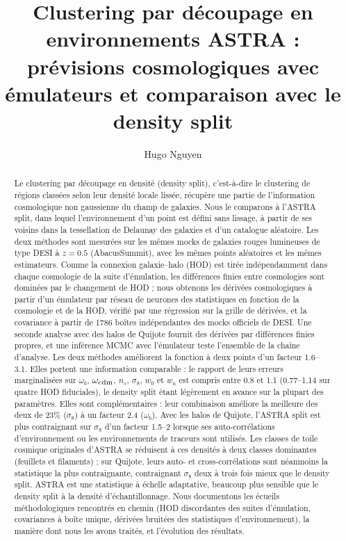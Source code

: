 \documentclass[11pt,twocolumn]{article}
\title{Clustering par découpage en environnements ASTRA : prévisions cosmologiques avec émulateurs et comparaison avec le density split}
\author{Hugo Nguyen}
\date{}
\begin{document}
\maketitle

\begin{abstract}
Le clustering par découpage en densité (density split), c'est-à-dire le clustering de régions classées selon leur densité locale lissée, récupère une partie de l'information cosmologique non gaussienne du champ de galaxies. Nous le comparons à l'ASTRA split, dans lequel l'environnement d'un point est défini sans lissage, à partir de ses voisins dans la tessellation de Delaunay des galaxies et d'un catalogue aléatoire. Les deux méthodes sont mesurées sur les mêmes mocks de galaxies rouges lumineuses de type DESI à $z=0.5$ (AbacusSummit), avec les mêmes points aléatoires et les mêmes estimateurs. Comme la connexion galaxie--halo (HOD) est tirée indépendamment dans chaque cosmologie de la suite d'émulation, les différences finies entre cosmologies sont dominées par le changement de HOD ; nous obtenons les dérivées cosmologiques à partir d'un émulateur par réseau de neurones des statistiques en fonction de la cosmologie et de la HOD, vérifié par une régression sur la grille de dérivées, et la covariance à partir de 1786 boîtes indépendantes des mocks officiels de DESI. Une seconde analyse avec des halos de Quijote fournit des dérivées par différences finies propres, et une inférence MCMC avec l'émulateur teste l'ensemble de la chaîne d'analyse. Les deux méthodes améliorent la fonction à deux points d'un facteur 1.6--3.1. Elles portent une information comparable : le rapport de leurs erreurs marginalisées sur $\omega_b$, $\omega_{\rm cdm}$, $n_s$, $\sigma_8$, $w_0$ et $w_a$ est compris entre 0.8 et 1.1 (0.77--1.14 sur quatre HOD fiduciales), le density split étant légèrement en avance sur la plupart des paramètres. Elles sont complémentaires : leur combinaison améliore la meilleure des deux de 23\% ($\sigma_8$) à un facteur 2.4 ($\omega_b$). Avec les halos de Quijote, l'ASTRA split est plus contraignant sur $\sigma_8$ d'un facteur 1.5--2 lorsque ses auto-corrélations d'environnement ou les environnements de traceurs sont utilisés. Les classes de toile cosmique originales d'ASTRA se réduisent à ces densités à deux classes dominantes (feuillets et filaments) ; sur Quijote, leurs auto- et cross-corrélations sont néanmoins la statistique la plus contraignante, contraignant $\sigma_8$ deux à trois fois mieux que le density split. ASTRA est une statistique à échelle adaptative, beaucoup plus sensible que le density split à la densité d'échantillonnage. Nous documentons les écueils méthodologiques rencontrés en chemin (HOD discordantes des suites d'émulation, covariances à boîte unique, dérivées bruitées des statistiques d'environnement), la manière dont nous les avons traités, et l'évolution des résultats.
\end{abstract}
\end{document}
